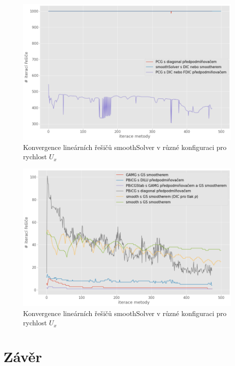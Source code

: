 \documentclass[a4paper,12pt]{report}
\theoremstyle{remark}
\begin{document}
\begin{figure}[H]
	\centering
	\includegraphics[width=1\linewidth]{p-solver-iters-2.png}
	\caption{Konvergence lineárních řešičů smoothSolver v různé konfiguraci pro rychlost $U_x$}
	\label{fig:p-iters-2}
\end{figure}

\begin{figure}[H]
	\centering
	\includegraphics[width=1\linewidth]{ux-solver-iters.png}
	\caption{Konvergence lineárních řešičů smoothSolver v různé konfiguraci pro rychlost $U_x$}
	\label{fig:ux-iters}
\end{figure}



{\let\clearpage\relax \chapter{Závěr}}
\end{document}
